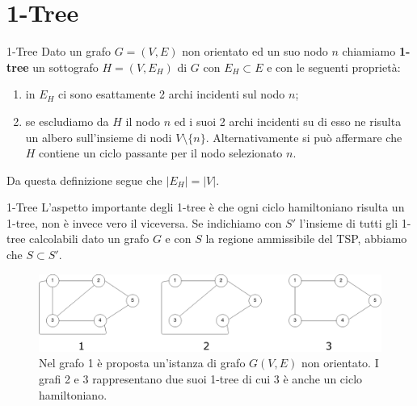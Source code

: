 \documentclass[10pt]{beamer}
\begin{document}
\section{1-Tree}
\begin{frame}{1-Tree}
    Dato un grafo $G=(V,E)$ non orientato ed un suo nodo $n$ chiamiamo \textbf{1-tree} un sottografo $H = (V, E_H)$ di $G$ con $E_H \subset E$ e con le seguenti proprietà:
    \begin{enumerate}
        \item in $E_H$ ci sono esattamente 2 archi incidenti sul nodo $n$;
        \item se escludiamo da $H$ il nodo $n$ ed i suoi 2 archi incidenti su di esso ne risulta un albero sull'insieme di nodi $V \setminus \{n\}$. Alternativamente si può affermare che $H$ contiene un ciclo passante per il nodo selezionato $n$.
    \end{enumerate}
    Da questa definizione segue che $|E_H| = |V|$.
\end{frame}

\begin{frame}{1-Tree}
    L'aspetto importante degli 1-tree è che ogni ciclo hamiltoniano risulta un 1-tree, non è invece vero il viceversa. Se indichiamo con $S'$ l'insieme di tutti gli 1-tree calcolabili dato un grafo $G$ e con $S$ la regione ammissibile del TSP, abbiamo che $S \subset S'$.
    
    \begin{figure}
        \centering
         \includegraphics[scale=0.21]{files/1TreeEsempi.png}
        \caption{Nel grafo 1 è proposta un'istanza di grafo $G(V,E)$ non orientato. I grafi 2 e 3 rappresentano due suoi 1-tree di cui 3 è anche un ciclo hamiltoniano.}
    \end{figure}
       
   
\end{frame}
\end{document}
